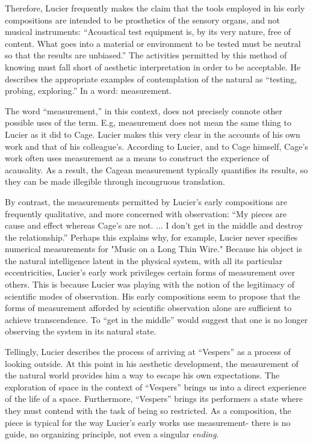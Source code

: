 \documentclass[a4paper,10pt]{report}
\numberwithin{equation}{section}
\begin{document}
Therefore, Lucier frequently makes the claim that the tools employed in his early compositions are intended to be prosthetics of the sensory organs, and not musical instruments: ``Acoustical test equipment is, by its very nature, free of content. What goes into a material or environment to be tested must be neutral so that the results are unbiased.''\cite[p.~456]{lucier1995} The activities permitted by this method of knowing must fall short of aesthetic interpretation in order to be acceptable. He describes the appropriate examples of contemplation of the natural as ``testing, probing, exploring.''\cite[p.~440]{lucier1995} In a word: measurement.

The word ``measurement,'' in this context, does not precisely connote other possible uses of the term. E.g, measurement does not mean the same thing to Lucier as it did to Cage. Lucier makes this very clear in the accounts of his own work and that of his colleague's. According to Lucier, and to Cage himself, Cage's work often uses measurement as a means to construct the experience of acausality. As a result, the Cagean measurement typically quantifies its results, so they can be made illegible through incongruous translation. 

By contrast, the measurements permitted by Lucier's early compositions are frequently qualitative, and more concerned with observation: ``My pieces are cause and effect whereas Cage's are not. ... I don't get in the middle and destroy the relationship.''\cite[p.~230]{lucier1995} Perhaps this explains why, for example, Lucier never specifies numerical measurements for "Music on a Long Thin Wire." Because his object is the natural intelligence latent in the physical system, with all its particular eccentricities, Lucier's early work privileges certain forms of measurement over others. This is because Lucier was playing with the notion of the legitimacy of scientific modes of observation. His early compositions seem to propose that the forms of measurement afforded by scientific observation alone are sufficient to achieve transcendence. To ``get in the middle'' would suggest that one is no longer observing the system in its natural state. 

Tellingly, Lucier describes the process of arriving at ``Vespers'' as a process of looking outside.\cite[p.84]{lucier2012} At this point in his aesthetic development, the measurement of the natural world provides him a way to escape his own expectations. The exploration of space in the context of  ``Vespers'' brings us into a direct experience of the life of a space. Furthermore, ``Vespers'' brings its performers a state where they must contend with the task of being so restricted. As a composition, the piece is typical for the way Lucier's early works use measurement- there is no guide, no organizing principle, not even a singular \emph{ending}. 
\end{document}

